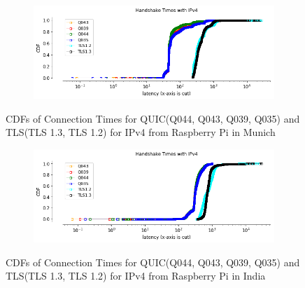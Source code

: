 \begin{frame}
\begin{figure}[!htb]
    
    \begin{subfigure}{0.5\textwidth}
        \includegraphics[width=\linewidth]{./plots/PI/handshake_times_ipv4.png}
    \end{subfigure}
    
    \caption{CDFs of Connection Times for QUIC(Q044, Q043, Q039, Q035) and TLS(TLS 1.3, TLS 1.2) for IPv4 from Raspberry Pi in Munich}\label{fig:cdfs-of-connectionin}
\end{figure}

\begin{figure}[!htb]
    
    \begin{subfigure}{0.5\textwidth}
        \includegraphics[width=\linewidth]{./plots/India/handshake_times_ipv4.png}
    \end{subfigure}
    
    \caption{CDFs of Connection Times for QUIC(Q044, Q043, Q039, Q035) and TLS(TLS 1.3, TLS 1.2) for IPv4 from Raspberry Pi in India}\label{fig:cdfs-of-connectionm}
\end{figure}


\end{frame}
\clearpage

